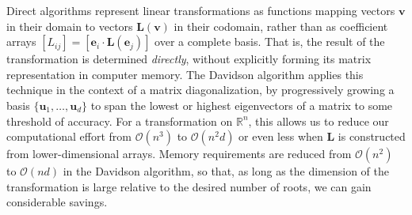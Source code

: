 Direct algorithms represent linear transformations as functions mapping vectors
\(
    \mathbf{v}
\)
in their domain to vectors
\(
    \mathbf{L}(\mathbf{v})
\)
in their codomain, rather than as coefficient arrays
\(
    [L_{ij}]
    =
    [\mathbf{e}_i \cdot \mathbf{L}(\mathbf{e}_j)]
\)
over a complete basis.
That is, the result of the transformation is determined {\itshape directly},
without explicitly forming its matrix representation in computer memory.
The Davidson algorithm applies this technique in the context of a matrix
diagonalization, by progressively growing a basis
\(
    \{\mathbf{u}_1, \ldots,\mathbf{u}_d\}
\)
to span the lowest or highest eigenvectors of a matrix to some threshold of
accuracy.
For a transformation on \(\mathbb{R}^n\), this allows us to reduce our
computational effort from \(\mathcal{O}(n^3)\) to \(\mathcal{O}(n^2 d)\) or even
less when \(\mathbf{L}\) is constructed from lower-dimensional arrays.
Memory requirements are reduced from \(\mathcal{O}(n^2)\) to \(\mathcal{O}(nd)\)
in the Davidson algorithm, so that, as long as the dimension of the
transformation is large relative to the desired number of roots, we can gain
considerable savings.


